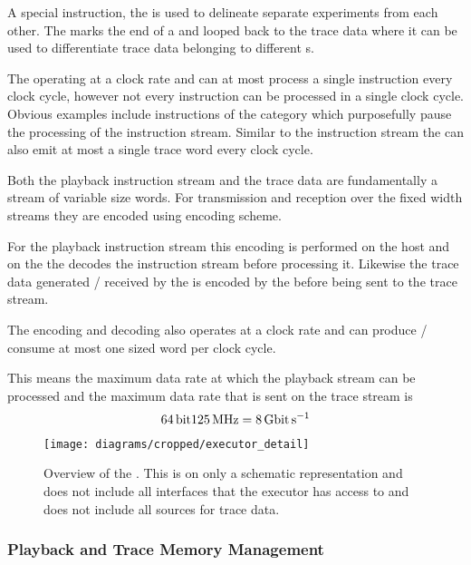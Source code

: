 A special instruction, the \haltInstr{} is used to delineate separate experiments from each other. The \haltInstr{} marks the end of a \PlaybackProgram{} and looped back to the trace data where it can be used to differentiate trace data belonging to different \PlaybackProgram{}s.

The \pbexec{} operating at a \pbExecClock{} clock rate and can at most process a single instruction every clock cycle, however not every instruction can be processed in a single clock cycle. Obvious examples include instructions of the \wait{} category which purposefully pause the processing of the instruction stream. Similar to the instruction stream the \pbexec{} can also emit at most a single trace word every clock cycle.


Both the playback instruction stream and the trace data are fundamentally a stream of variable size words. For transmission and reception over the fixed width \HostARQ{} streams they are encoded using \UT{} encoding scheme\autocite{ref:ut}.

For the playback instruction stream this encoding is performed on the host and on the \FPGA{} the \pbexec{} decodes the instruction stream before processing it.
Likewise the trace data generated / received by the \pbexec{} is encoded by the \pbexec{} before being sent to the trace stream.

The encoding and decoding also operates at a \pbExecClock{} clock rate and can produce / consume at most one \PhyWordSize{} sized word per clock cycle.

This means the maximum data rate at which the playback stream can be processed and the maximum data rate that is sent on the trace stream is
\[\PhyWordSize{} \pbExecClock{} = \pbExecBandwidth{}\]

\begin{figure}
\centerline{\texttt{[image: diagrams/cropped/executor\_detail]}}
\caption{Overview of the \pbexec{}. This is on only a schematic representation and does not include all interfaces that the executor has access to and does not include all sources for trace data.}\label{diagram:executor}
\end{figure}

\subsubsection{Playback and Trace Memory Management}\label{sec:old-pb-trace-management}

